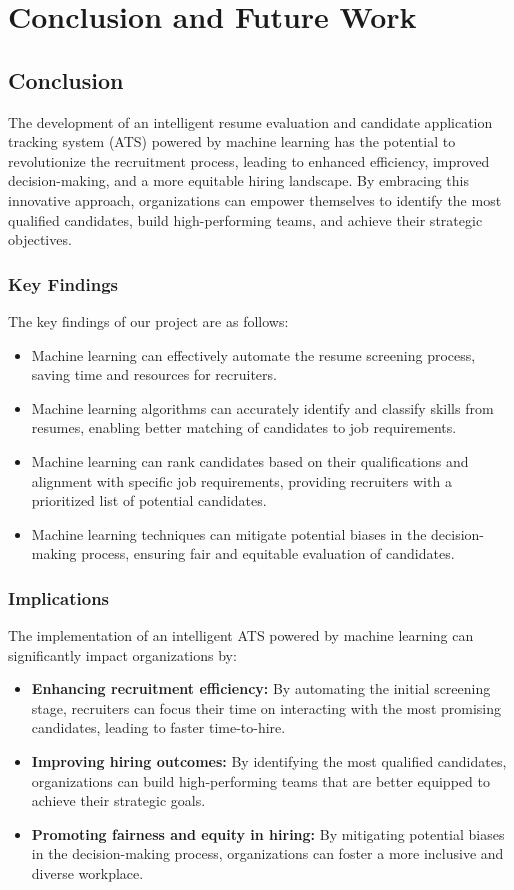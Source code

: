 \chapter{Conclusion and Future Work}
\section{Conclusion}
The development of an intelligent resume evaluation and candidate application tracking system (ATS) powered by machine learning has the potential to revolutionize the recruitment process, leading to enhanced efficiency, improved decision-making, and a more equitable hiring landscape. By embracing this innovative approach, organizations can empower themselves to identify the most qualified candidates, build high-performing teams, and achieve their strategic objectives.

\subsection{Key Findings}
The key findings of our project are as follows:
\begin{itemize}
    \item Machine learning can effectively automate the resume screening process, saving time and resources for recruiters.
    \item Machine learning algorithms can accurately identify and classify skills from resumes, enabling better matching of candidates to job requirements.
    \item Machine learning can rank candidates based on their qualifications and alignment with specific job requirements, providing recruiters with a prioritized list of potential candidates.
    \item Machine learning techniques can mitigate potential biases in the decision-making process, ensuring fair and equitable evaluation of candidates.
\end{itemize}

\subsection{Implications}
The implementation of an intelligent ATS powered by machine learning can significantly impact organizations by:

\begin{itemize}
    \item \textbf{Enhancing recruitment efficiency:} By automating the initial screening stage, recruiters can focus their time on interacting with the most promising candidates, leading to faster time-to-hire.
    \item \textbf{Improving hiring outcomes:} By identifying the most qualified candidates, organizations can build high-performing teams that are better equipped to achieve their strategic goals.
    \item \textbf{Promoting fairness and equity in hiring:} By mitigating potential biases in the decision-making process, organizations can foster a more inclusive and diverse workplace.
\end{itemize}

